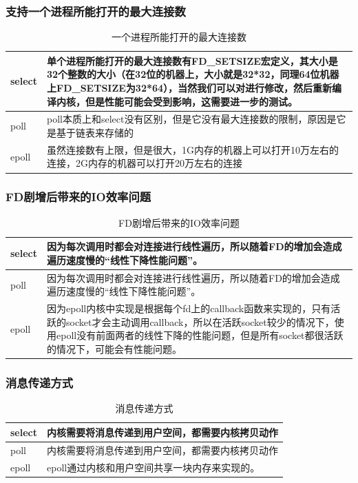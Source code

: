 \documentclass[UTF8,a4paper,12pt]{ctexbook}
\begin{document}
			\subsubsection{支持一个进程所能打开的最大连接数}
				\begin{table}[H]
					\centering
					\caption{一个进程所能打开的最大连接数}
					\begin{tabular}{l|m{14cm}}
						\hline
						select		& 单个进程所能打开的最大连接数有FD\_SETSIZE宏定义，其大小是32个整数的大小（在32位的机器上，大小就是32*32，同理64位机器上FD\_SETSIZE为32*64），当然我们可以对进行修改，然后重新编译内核，但是性能可能会受到影响，这需要进一步的测试。\\
						\hline
						poll		& poll本质上和select没有区别，但是它没有最大连接数的限制，原因是它是基于链表来存储的\\
						\hline
						epoll		& 虽然连接数有上限，但是很大，1G内存的机器上可以打开10万左右的连接，2G内存的机器可以打开20万左右的连接\\
						\hline
					\end{tabular}
				\end{table}
			\subsubsection{FD剧增后带来的IO效率问题}
				\begin{table}[H]
					\centering
					\caption{FD剧增后带来的IO效率问题}
					\begin{tabular}{l|m{14cm}}
						\hline
						select		& 因为每次调用时都会对连接进行线性遍历，所以随着FD的增加会造成遍历速度慢的“线性下降性能问题”。\\
						\hline
						poll		& 因为每次调用时都会对连接进行线性遍历，所以随着FD的增加会造成遍历速度慢的“线性下降性能问题”。\\
						\hline
						epoll		& 因为epoll内核中实现是根据每个fd上的callback函数来实现的，只有活跃的socket才会主动调用callback，所以在活跃socket较少的情况下，使用epoll没有前面两者的线性下降的性能问题，但是所有socket都很活跃的情况下，可能会有性能问题。\\
						\hline
					\end{tabular}
				\end{table}
			\subsubsection{消息传递方式}
				\begin{table}[H]
					\centering
					\caption{消息传递方式}
					\begin{tabular}{l|m{14cm}}
						\hline
						select		& 内核需要将消息传递到用户空间，都需要内核拷贝动作\\
						\hline
						poll		& 内核需要将消息传递到用户空间，都需要内核拷贝动作\\
						\hline
						epoll		& epoll通过内核和用户空间共享一块内存来实现的。\\
						\hline
					\end{tabular}
				\end{table}
			
\end{document}
